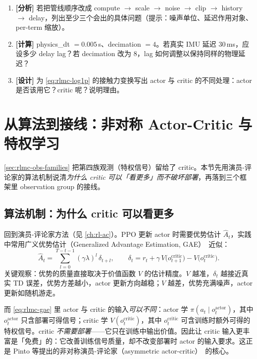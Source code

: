 \begin{practice}[练习·处理管线]
\begin{enumerate}
  \item \textbf{[分析]} 若把管线顺序改成 compute $\to$ scale $\to$ noise $\to$ clip $\to$ history $\to$ delay，列出至少三个会出的具体问题（提示：噪声单位、延迟作用对象、per-term 缩放）。
  \item \textbf{[计算]} physics\_dt $=0.005\,$s、decimation $=4$。若真实 IMU 延迟 $30\,$ms，应设多少 delay lag？若 decimation 改为 $8$，lag 如何调整以保持同样的物理延迟？
  \item \textbf{[设计]} 为 \cref{eq:rlmc-log1p} 的接触力变换写出 actor 与 critic 的不同处理：actor 是否该用它？critic 呢？说明理由。
\end{enumerate}
\end{practice}

\section{从算法到接线：非对称 Actor-Critic 与特权学习}
\label{sec:rlmc-asymmetric}

\cref{sec:rlmc-obs-families} 把第四族观测（特权信号）留给了 critic。本节先用演员-评论家的算法机制说清\emph{为什么 critic 可以「看更多」而不破坏部署}，再落到三个框架里 observation group 的接线。

\subsection{算法机制：为什么 critic 可以看更多}
\label{sec:rlmc-why-asymmetric}

回到演员-评论家方法（见 \cref{ch:rl-ac}）。PPO 更新 actor 时需要优势估计 $\hat A_t$，实践中常用广义优势估计（Generalized Advantage Estimation, GAE）\,\cite{schulman2016gae} 近似：
\begin{equation}
\hat A_t = \sum_{l=0}^{T-t-1}(\gamma\lambda)^l\,\delta_{t+l},
\qquad
\delta_t = r_t + \gamma\,V\!\big(o^{\text{critic}}_{t+1}\big) - V\!\big(o^{\text{critic}}_t\big).
\label{eq:rlmc-gae}
\end{equation}
关键观察：优势的质量直接取决于价值函数 $V$ 的估计精度。$V$ 越准，$\delta_t$ 越接近真实 TD 误差，优势方差越小，actor 更新方向越稳；$V$ 越差，优势充满噪声，actor 更新如随机游走。

而 \cref{eq:rlmc-gae} 里 actor 与 critic 的输入\emph{可以不同}：actor 学 $\pi(a_t\mid o^{\text{actor}}_t)$，其中 $o^{\text{actor}}_t$ 只含部署可得信号；critic 学 $V(o^{\text{critic}}_t)$，其中 $o^{\text{critic}}_t$ 可含训练时额外可得的特权信号。critic \emph{不需要部署}——它只在训练中输出价值。因此让 critic 输入更丰富是「免费」的：它改善训练信号质量，却不改变部署时 actor 的输入要求。这正是 Pinto 等提出的非对称演员-评论家（asymmetric actor-critic）\,\cite{pinto2018asymmetric} 的核心。

